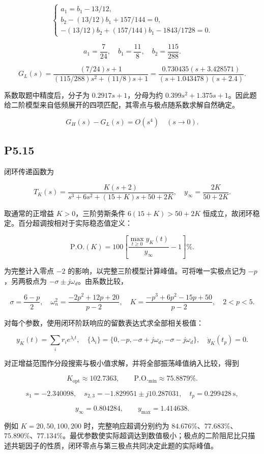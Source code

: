 \documentclass[UTF8,12pt]{ctexart}
\begin{document}
\[
\begin{cases}a_1=b_1-13/12,\\b_2-(13/12)b_1+157/144=0,\\-(13/12)b_2+(157/144)b_1-1843/1728=0.\end{cases}
\]

\[
\boxed{a_1=\frac7{24},\quad b_1=\frac{11}{8},\quad b_2=\frac{115}{288}}.
\]

\[
\boxed{G_L(s)=\frac{(7/24)s+1}{(115/288)s^2+(11/8)s+1}=\frac{0.730435(s+3.428571)}{(s+1.043478)(s+2.4)}}.
\]

系数取题中精度后，分子为 $0.2917s+1$，分母为约 $0.399s^2+1.375s+1$。因此题给二阶模型来自低频展开的四项匹配，其零点与极点随系数求解自然确定。

\[
G_H(s)-G_L(s)=O(s^4)\quad(s\to0).
\]


\subsection*{P5.15}
闭环传递函数为

\[
T_K(s)=\frac{K(s+2)}{s^3+6s^2+(15+K)s+50+2K},\quad y_\infty=\frac{2K}{50+2K}.
\]

取通常的正增益 $K>0$，三阶劳斯条件 $6(15+K)>50+2K$ 恒成立，故闭环稳定。百分超调按相对于实际稳态值定义：

\[
\mathrm{P.O.}(K)=100\left[\frac{\max_{t\ge0}y_K(t)}{y_\infty}-1\right]\%.
\]

为完整计入零点 $-2$ 的影响，以完整三阶模型计算峰值。可将唯一实极点记为 $-p$，另两极点为 $-\sigma\pm j\omega_d$。由系数比较，

\[
\sigma=\frac{6-p}{2},\quad \omega_n^2=\frac{-2p^2+12p+20}{p-2},\quad K=\frac{-p^3+6p^2-15p+50}{p-2},\quad2<p<5.
\]

对每个参数，使用闭环阶跃响应的留数表达式求全部相关极值：

\[
y_K(t)=\sum_i r_i e^{\lambda_it},\quad\{\lambda_i\}=\{0,-p,-\sigma+j\omega_d,-\sigma-j\omega_d\},\quad\dot y_K(t_p)=0.
\]

对正增益范围作分段搜索与极小值求解，并将全部振荡峰值纳入比较，得到

\[
\boxed{K_{\mathrm{opt}}\approx102.7363,\qquad\mathrm{P.O.}_{\min}\approx75.8879\%}.
\]

\[
s_1=-2.340098,\quad s_{2,3}=-1.829951\pm j10.287031,\quad t_p=0.299428\ \mathrm s,
\]

\[
y_\infty=0.804284,\qquad y_{\max}=1.414638.
\]

例如 $K=20,50,100,200$ 时，完整响应超调分别约为 $84.676\%$、$77.683\%$、$75.890\%$、$77.134\%$。最优参数使实际超调达到数值极小；极点的二阶阻尼比只描述共轭因子的性质，闭环零点与第三极点共同决定此题的实际峰值。
\end{document}
